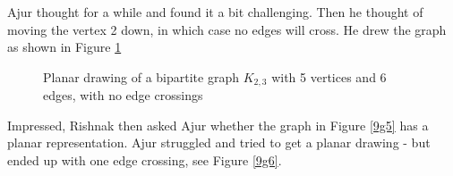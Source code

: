 Ajur thought for a while and found it a bit challenging. Then he thought of moving the vertex 2 down, in which case no edges will cross. He drew the graph as shown in Figure \ref{9g4}
\begin{figure}
\begin{center}
\caption{ Planar drawing of a bipartite graph $K_{2,3}$ with 5 vertices and 6 edges, with no edge crossings}\label{9g4}
\end{center}
\end{figure}

Impressed, Rishnak then asked Ajur whether the graph in Figure \ref{9g5} has a planar representation. Ajur struggled and tried to get a planar drawing - but ended up with one edge crossing, see Figure \ref{9g6}. 

